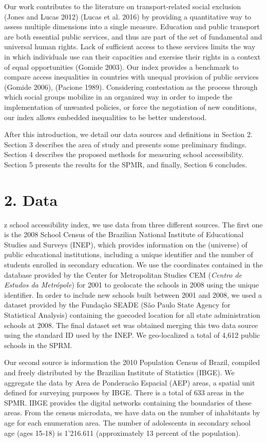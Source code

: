 \documentclass[]{article}
\begin{document}
Our work contributes to the literature on transport-related social
exclusion (Jones and Lucas 2012) (Lucas et al. 2016) by providing a
quantitative way to assess multiple dimensions into a single measure.
Education and public transport are both essential public services, and
thus are part of the set of fundamental and universal human rights. Lack
of sufficient access to these services limits the way in which
individuals use can their capacities and exersise their rights in a
context of equal opportunities (Gomide 2003). Our index provides a
benchmark to compare access inequalities in countries with unequal
provision of public services (Gomide 2006), (Pacione 1989). Considering
contestation as the process through which social groups mobilize in an
organized way in order to impede the implementation of unwanted
policies, or force the negotiation of new conditions, our index allows
embedded inequalities to be better understood.

After this introduction, we detail our data sources and definitions in
Section 2. Section 3 describes the area of study and presents some
preliminary findings. Section 4 describes the proposed methods for
measuring school accessibility. Section 5 presents the results for the
SPMR, and finally, Section 6 concludes.

\section{2. Data}\label{data}

z school accessibility index, we use data from three
different sources. The first one is the 2008 School Census of the
Brazilian National Institute of Educational Studies and Surveys (INEP),
which provides information on the (universe) of public educational
institutions, including a unique identifier and the number of students
enrolled in secondary education. We use the coordinates contained in the
database provided by the Center for Metropolitan Studies CEM
(\textit{Centro de Estudos da Metrópole}) for 2001 to geolocate the
schools in 2008 using the unique identifier. In order to include new
schools built between 2001 and 2008, we used a dataset provided by the
Fundação SEADE (São Paulo State Agency for Statistical Analysis)
containing the goecoded location for all state administration schools at
2008. The final dataset set was obtained merging this two data source
using the standard ID used by the INEP. We geo-localized a total of
4,612 public schools in the SPRM.

Our second source is information the 2010 Population Census of Brazil,
compiled and freely distributed by the Brazilian Institute of Statistics
(IBGE). We aggregate the data by Area de Ponderacão Espacial (AEP)
areas, a spatial unit defined for surveying purposes by IBGE. There is a
total of 633 areas in the SPMR. IBGE provides the digital networks
containing the boundaries of these areas. From the census microdata, we
have data on the number of inhabitants by age for each enumeration area.
The number of adolescents in secondary school age (ages 15-18) is
1'216.611 (approximately 13 percent of the population).
\end{document}
